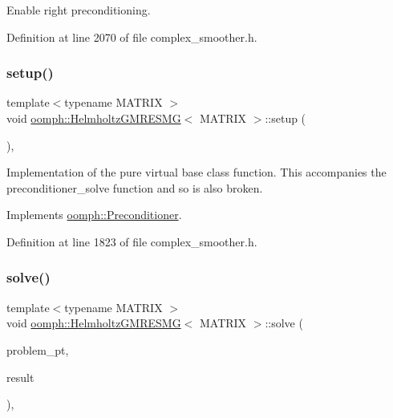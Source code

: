 Enable right preconditioning. 



Definition at line 2070 of file complex\+\_\+smoother.\+h.

\mbox{\label{classoomph_1_1HelmholtzGMRESMG_ae566e34da6aa9ca70a034f7ef93a1aa5}} 
\subsubsection{\texorpdfstring{setup()}{setup()}}
{\footnotesize\ttfamily template$<$typename M\+A\+T\+R\+IX $>$ \\
void \hyperlink{classoomph_1_1HelmholtzGMRESMG}{oomph\+::\+Helmholtz\+G\+M\+R\+E\+S\+MG}$<$ M\+A\+T\+R\+IX $>$\+::setup (\begin{DoxyParamCaption}{ }\end{DoxyParamCaption})\hspace{0.3cm}{\ttfamily [inline]}, {\ttfamily [virtual]}}



Implementation of the pure virtual base class function. This accompanies the preconditioner\+\_\+solve function and so is also broken. 



Implements \hyperlink{classoomph_1_1Preconditioner_af4886f4efe510e5c9b0eb19422943588}{oomph\+::\+Preconditioner}.



Definition at line 1823 of file complex\+\_\+smoother.\+h.

\mbox{\label{classoomph_1_1HelmholtzGMRESMG_a5806236b991ac2d7fe4bc7a4f19e98fb}} 
\subsubsection{\texorpdfstring{solve()}{solve()}\hspace{0.1cm}{\footnotesize\ttfamily [1/3]}}
{\footnotesize\ttfamily template$<$typename M\+A\+T\+R\+IX $>$ \\
void \hyperlink{classoomph_1_1HelmholtzGMRESMG}{oomph\+::\+Helmholtz\+G\+M\+R\+E\+S\+MG}$<$ M\+A\+T\+R\+IX $>$\+::solve (\begin{DoxyParamCaption}\item[{\hyperlink{classoomph_1_1Problem}{Problem} $\ast$const \&}]{problem\+\_\+pt,  }\item[{\hyperlink{classoomph_1_1DoubleVector}{Double\+Vector} \&}]{result }\end{DoxyParamCaption})\hspace{0.3cm}{\ttfamily [inline]}, {\ttfamily [virtual]}}



